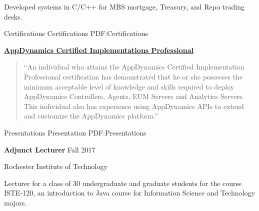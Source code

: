 \documentclass[letterpaper,MMMMyyyy,nonstopmode]{simpleresumecv}
\begin{document}
\begin{Body}
\begin{Detail}
\Item
Developed systems in C/C++ for MBS mortgage, Treasury, and Repo trading desks.
\end{Detail}

\iffalse
\BigGap
\Entry
\textbf{Prophet 21, Inc.}
\hfill 
Yardley, Pennsylvania

Associate Developer
\hfill
\DatestampYM{1992}{06} --  \DatestampYM{1993}{03}

\begin{Detail}
\BulletItem
Wrote and maintained features for point-of-sale systems targeted to retailers and wholesalers

\Gap
Technologies: Sybase, ksh
\end{Detail}
\fi



\Section
{Certifications}
{Certifications}
{PDF:Certifications}

\Entry
\href{https://www.appdynamics.com/certifications/}
{\textbf{AppDynamics Certified Implementations Professional}}
\hfill
{}
\begin{Detail}
\begin{quote}
``An individual who attains the AppDynamics Certified Implementation Professional certification has demonstrated that he or she possesses the minimum acceptable level of knowledge and skills required to deploy AppDynamics Controllers, Agents, EUM Servers and Analytics Servers. 
This individual also has experience using AppDynamics APIs to extend and customize the AppDynamics platform.''
\end{quote}
\end{Detail}



\Section
{Presentations}%
{Presentation}%
{PDF:Presentations}%

\iffalse      %
\Entry
\textbf{Adjunct Lecturer}
\hfill
Fall 2017

Rochester Institute of Technology
\begin{Detail}
\Item
Lecturer for a class of 30 undergraduate and graduate students for the course ISTE-120, an introduction to Java course for Information Science and Technology majors.
\end{Detail}


\end{Body}
\end{document}
